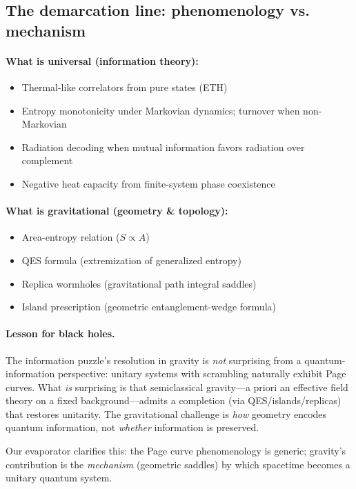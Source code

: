 \documentclass[aps,prx,onecolumn,showpacs,superscriptaddress,longbibliography,nofootinbib]{revtex4-2}
\begin{document}
\subsection{The demarcation line: phenomenology vs. mechanism}

\paragraph{What is universal (information theory):}
\begin{itemize}[leftmargin=*]
\item Thermal-like correlators from pure states (ETH)
\item Entropy monotonicity under Markovian dynamics; turnover when non-Markovian
\item Radiation decoding when mutual information favors radiation over complement
\item Negative heat capacity from finite-system phase coexistence
\end{itemize}

\paragraph{What is gravitational (geometry \& topology):}
\begin{itemize}[leftmargin=*]
\item Area-entropy relation ($S \propto A$)
\item QES formula (extremization of generalized entropy)
\item Replica wormholes (gravitational path integral saddles)
\item Island prescription (geometric entanglement-wedge formula)
\end{itemize}

\paragraph{Lesson for black holes.}
The information puzzle's resolution in gravity is \emph{not} surprising from a quantum-information perspective: unitary systems with scrambling naturally exhibit Page curves. What \emph{is} surprising is that semiclassical gravity---a priori an effective field theory on a fixed background---admits a completion (via QES/islands/replicas) that restores unitarity. The gravitational challenge is \emph{how} geometry encodes quantum information, not \emph{whether} information is preserved.

Our evaporator clarifies this: the Page curve phenomenology is generic; gravity's contribution is the \emph{mechanism} (geometric saddles) by which spacetime becomes a unitary quantum system.
\end{document}
